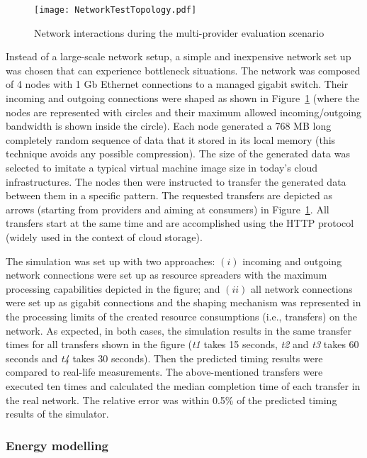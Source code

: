 \documentclass[sort, compress, 5p]{elsarticle}
\begin{document}
\begin{figure}[tb]
\center
\texttt{[image: NetworkTestTopology.pdf]}
\caption{Network interactions during the multi-provider evaluation scenario\label{FIG-NWTest}}
\end{figure}

Instead of a large-scale network setup, a simple and inexpensive network set up was chosen that can  experience bottleneck situations. The network was composed of 4 nodes with 1 Gb Ethernet connections to a managed gigabit switch. Their incoming and outgoing connections were shaped as shown in Figure~\ref{FIG-NWTest} (where the nodes are represented with circles and their maximum allowed incoming/outgoing bandwidth is shown inside the circle). Each node generated a 768 MB long completely random sequence of data that it stored in its local memory (this technique avoids any possible compression). The size of the generated data was selected to imitate a typical virtual machine image size in today's cloud infrastructures. The nodes then were instructed to transfer the generated data between them in a specific pattern. The requested transfers are depicted as arrows (starting from providers and aiming at consumers) in Figure~\ref{FIG-NWTest}. All transfers start at the same time and are accomplished using the HTTP protocol (widely used in the context of cloud storage).

The simulation was set up with two approaches: $(i)$ incoming and outgoing network connections were set up as resource spreaders with the maximum processing capabilities depicted in the figure; and $(ii)$ all network connections were set up as gigabit connections and the shaping mechanism was represented in the processing limits of the created resource consumptions (i.e., transfers) on the network. As expected, in both cases, the simulation results in the same transfer times for all transfers shown in the figure (\emph{t1} takes 15 seconds, \emph{t2} and \emph{t3} takes 60 seconds and \emph{t4} takes 30 seconds). Then the predicted timing results were compared to real-life measurements. The above-mentioned transfers were executed ten times and calculated the median completion time of each transfer in the real network. The relative error was within 0.5\% of the predicted timing results of the simulator.  

\subsubsection{Energy modelling}
\end{document}
